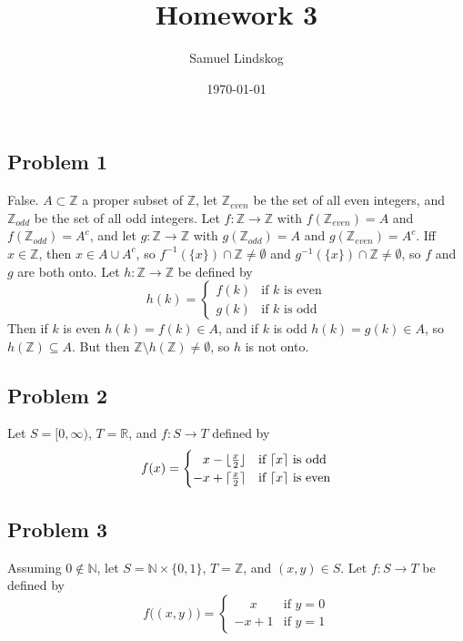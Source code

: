 \documentclass{article}
\title{Homework 3}
\author{Samuel Lindskog}
\date\today
\DeclarePairedDelimiter{\ceil}{\lceil}{\rceil}
\DeclarePairedDelimiter{\floor}{\lfloor}{\rfloor}
\begin{document}
\maketitle
\subsection*{Problem 1}
False. \(A\subset\mathbb{Z}\) a proper subset of \(\mathbb{Z}\), let \(\mathbb{Z}_{even}\) be the set of all even integers, and \(\mathbb{Z}_{odd}\) be the set of all odd integers. Let \(f:\mathbb{Z}\rightarrow\mathbb{Z}\) with \(f(\mathbb{Z}_{even})=A\) and \(f(\mathbb{Z}_{odd})=A^c\), and let \(g:\mathbb{Z}\rightarrow\mathbb{Z}\) with \(g(\mathbb{Z}_{odd})=A\) and \(g(\mathbb{Z}_{even})=A^c\). Iff \(x\in\mathbb{Z}\), then \(x\in A\cup A^c\), so \(f^{-1}(\{x\})\cap\mathbb{Z}\neq\emptyset\) and \(g^{-1}(\{x\})\cap\mathbb{Z}\neq\emptyset\), so \(f\) and \(g\) are both onto. Let \(h:\mathbb{Z}\rightarrow\mathbb{Z}\) be defined by
\begin{equation*}
	h(k)=\begin{cases}f(k)&\text{if \(k\) is even}\\g(k)&\text{if \(k\) is odd}\end{cases}
\end{equation*}
Then if \(k\) is even \(h(k)=f(k)\in A\), and if \(k\) is odd \(h(k)=g(k)\in A\), so \(h(\mathbb{Z})\subseteq A\). But then \(\mathbb{Z}\setminus h(\mathbb{Z})\neq\emptyset\), so \(h\) is not onto.
\subsection*{Problem 2}
Let \(S=[0,\infty)\), \(T=\mathbb{R}\), and \(f:S\rightarrow T\) defined by
\begin{equation*}
	f(x)=\begin{cases}\phantom{-}x-\floor{\frac{x}{2}}&\text{if }\ceil{x}\text{ is odd}\\
	-x+\ceil{\frac{x}{2}}&\text{if }\ceil{x}\text{ is even}\end{cases}
\end{equation*}
\subsection*{Problem 3}
Assuming \(0\notin\mathbb{N}\), let \(S=\mathbb{N}\times\{0,1\}\), \(T=\mathbb{Z}\), and \((x,y)\in S\). Let \(f:S\rightarrow T\) be defined by
\begin{equation*}
	f\big((x,y)\big)=\begin{cases}\phantom{-}x&\text{if }y=0\\-x+1&\text{if }y=1\end{cases}
\end{equation*}
\end{document}
